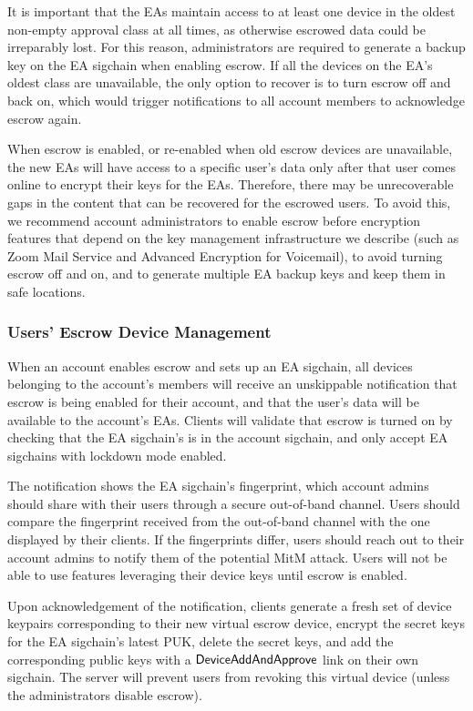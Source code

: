 It is important that the EAs maintain access to at least one device in the oldest non-empty approval
class at all times, as otherwise escrowed data could be irreparably lost. For this reason,
administrators are required to generate a backup key on the EA sigchain when enabling escrow. If all
the devices on the EA's oldest class are unavailable, the only option to recover is to turn escrow
off and back on, which would trigger notifications to all account members to acknowledge escrow
again.

When escrow is enabled, or re-enabled when old escrow devices are unavailable, the new EAs will have
access to a specific user's data only after that user comes online to encrypt their keys for the
EAs. Therefore, there may be unrecoverable gaps in the content that can be recovered for the
escrowed users. To avoid this, we recommend account administrators to enable escrow before
encryption features that depend on the key management infrastructure we describe (such as Zoom Mail
Service and Advanced Encryption for Voicemail), to avoid turning escrow off and on, and to generate
multiple EA backup keys and keep them in safe locations.

\subsubsection{Users' Escrow Device Management}
\label{subsubsec:escrowmgmt}

When an account enables escrow and sets up an EA sigchain, all devices belonging to the account's
members will receive an unskippable notification that escrow is being enabled for their account, and
that the user's data will be available to the account's EAs. Clients will validate that escrow is
turned on by checking that the EA sigchain's \userID{} is in the account sigchain, and only accept
EA sigchains with lockdown mode enabled.

The notification shows the EA sigchain's fingerprint, which account admins should share with their
users through a secure out-of-band channel. Users should compare the fingerprint received from the
out-of-band channel with the one displayed by their clients. If the fingerprints differ, users
should reach out to their account admins to notify them of the potential MitM attack. Users will not
be able to use features leveraging their device keys until escrow is enabled.

Upon acknowledgement of the notification, clients generate a fresh set of device keypairs
corresponding to their new virtual escrow device, encrypt the secret keys for the EA sigchain's
latest PUK, delete the secret keys, and add the corresponding public keys with a
$\mathsf{DeviceAddAndApprove}{}$ link on their own sigchain. The server will prevent users from revoking
this virtual device (unless the administrators disable escrow).

